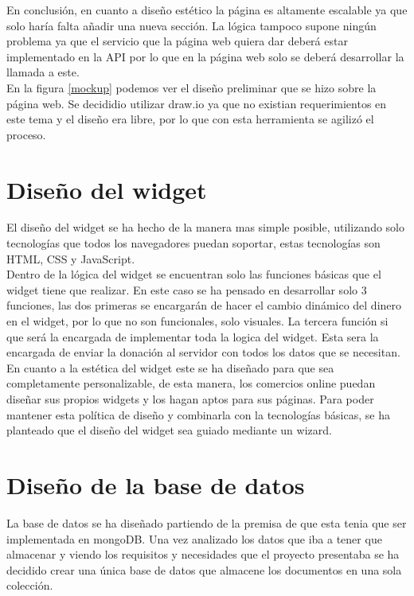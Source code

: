 En conclusión, en cuanto a diseño estético la página es altamente escalable ya que solo haría falta añadir una nueva sección. La lógica tampoco supone ningún problema ya que el servicio que la página web quiera dar deberá estar implementado en la API por lo que en la página web solo se deberá desarrollar la llamada a este.\\

En la figura \ref{mockup} podemos ver el diseño preliminar que se hizo sobre la página web. Se decididio utilizar draw.io ya que no existian requerimientos en este tema y el diseño era libre, por lo que con esta herramienta se agilizó el proceso.


\section{Diseño del widget}
El diseño del widget se ha hecho de la manera mas simple posible, utilizando solo tecnologías que todos los navegadores puedan soportar, estas tecnologías son HTML, CSS y JavaScript.\\

Dentro de la lógica del widget se encuentran solo las funciones básicas que el widget tiene que realizar. En este caso se ha pensado en desarrollar solo 3 funciones, las dos primeras se encargarán de hacer el cambio dinámico del dinero en el widget, por lo que no son funcionales, solo visuales. La tercera función si que será la encargada de implementar toda la logica del widget. Esta sera la encargada de enviar la donación al servidor con todos los datos que se necesitan.\\

En cuanto a la estética del widget este se ha diseñado para que sea completamente personalizable, de esta manera, los comercios online puedan diseñar sus propios widgets y los hagan aptos para sus páginas. Para poder mantener esta política de diseño y combinarla con la tecnologías básicas, se ha planteado que el diseño del widget sea guiado mediante un wizard.

\section{Diseño de la base de datos}
La base de datos se ha diseñado partiendo de la premisa de que esta tenia que ser implementada en mongoDB. Una vez analizado los datos que iba a tener que almacenar y viendo los requisitos y necesidades que el proyecto presentaba se ha decidido crear una única base de datos que almacene los documentos en una sola colección.\\

